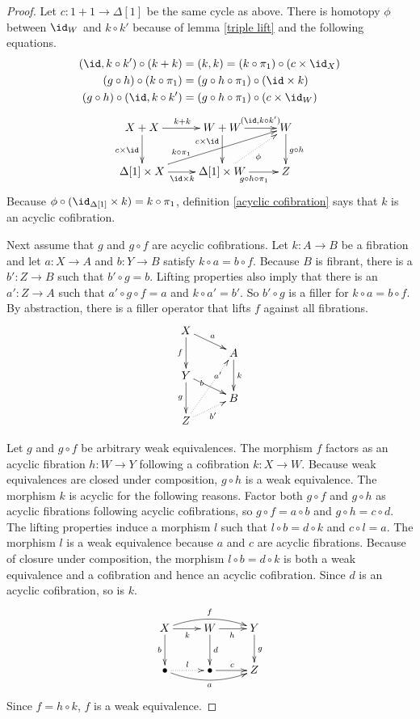 \documentclass{tac}
\newcommand\of{:}
\newcommand\simplex\Delta
\begin{document}
\begin{proof}
Let $c\of 1+1\to\simplex[1]$ be the same cycle as above. There is homotopy $\phi$ between $\id_W$ and $k\circ k'$ because of lemma \ref{triple lift} and the following equations.
\begin{align*}
(\id,k\circ k')\circ(k+k) &= (k,k) = (k\circ\pi_1)\circ (c\times\id_X)\\
(g\circ h)\circ (k\circ \pi_1) &= (g\circ h\circ \pi_1)\circ(\id\times k)\\
(g\circ h)\circ (\id,k\circ k') &= (g\circ h\circ \pi_1)\circ(c\times\id_W)
\end{align*}
\[\xymatrix{
X+X \ar[d]_{c\times \id}\ar[r]^{k+k} & W+W\ar[d]_(.3){c\times\id}\ar[r]^(.6){(\id,k\circ k')} & W\ar[d]^{g\circ h}\\
\simplex[1]\times X \ar[r]_{\id\times k}\ar[urr]^(.3){k\circ\pi_1}& \simplex[1]\times W\ar[r]_{g\circ h\circ \pi_1}\ar@{.>}[ur]_\phi & Z
}\]
Because $\phi\circ (\id_{\simplex[1]}\times k)=k\circ \pi_1$, definition \ref{acyclic cofibration} says that $k$ is an acyclic cofibration.

Next assume that $g$ and $g\circ f$ are acyclic cofibrations. Let $k\of A\to B$ be a fibration and let $a\of X\to A$ and $b\of Y\to B$ satisfy $k\circ a=b\circ f$. Because $B$ is fibrant, there is a $b'\of Z\to B$ such that $b'\circ g = b$. Lifting properties also imply that there is an $a'\of Z\to A$ such that $a'\circ g\circ f = a$ and $k\circ a'= b'$. So $b'\circ g$ is a filler for $k\circ a=b\circ f$. By abstraction, there is a filler operator that lifts $f$ against all fibrations.
\[\xy
(0,28)*+{X}="x",(14\halfrootthree,21)*+{A}="a",(0,14)*+{Y}="y",(14\halfrootthree,7)*+{B}="b",(0,0)*+{Z}="z"
\ar^a "x";"a" \ar_f "x";"y" \ar^k "a";"b" \ar|(.33)b "y";"b" \ar_g "y";"z"
\ar@{.>}_{b'} "z";"b" \ar@{.>}|(.67){a'} "z";"a"
\endxy\]

Let $g$ and $g\circ f$ be arbitrary weak equivalences. The morphism $f$ factors as an acyclic fibration $h\of W\to Y$ following a cofibration $k\of X\to W$. Because weak equivalences are closed under composition, $g\circ h$ is a weak equivalence. The morphism $k$ is acyclic for the following reasons. Factor both $g\circ f$ and $g\circ h$ as acyclic fibrations following acyclic cofibrations, so $g\circ f = a\circ b$ and $g\circ h = c\circ d$. The lifting properties induce a morphism $l$ such that $l\circ b = d\circ k$ and $c\circ l = a$. The morphism $l$ is a weak equivalence because $a$ and $c$ are acyclic fibrations. Because of closure under composition, the morphism $l\circ b = d\circ k$ is both a weak equivalence and a cofibration and hence an acyclic cofibration. Since $d$ is an acyclic cofibration, so is $k$.
\[\xymatrix{
X\ar[r]_k\ar@/^2ex/[rr]^f\ar[d]_b & W\ar[r]_h\ar[d]^d & Y\ar[d]^g \\
\bullet\ar@/_2ex/[rr]_a\ar@{.>}[r]^l & \bullet\ar[r]^c & Z
}\]
Since $f = h\circ k$, $f$ is a weak equivalence.


\end{proof}
\end{document}
